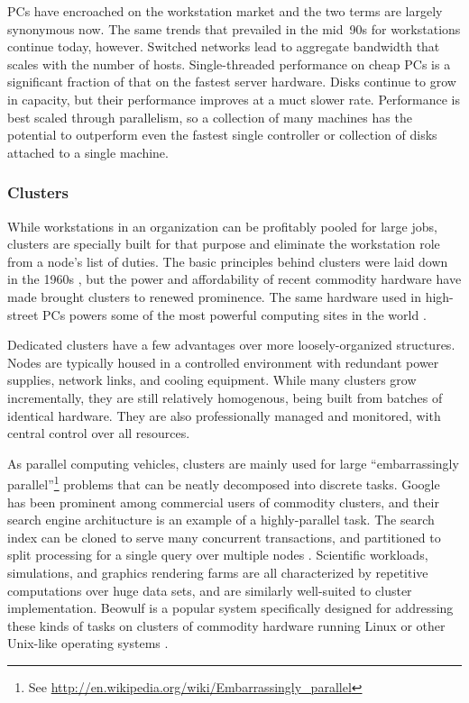 PCs have encroached on the workstation market and the two terms are largely synonymous now. The same trends that prevailed in the mid~90s for workstations continue today, however. Switched networks lead to aggregate bandwidth that scales with the number of hosts. Single-threaded performance on cheap PCs is a significant fraction of that on the fastest server hardware. Disks continue to grow in capacity, but their performance improves at a muct slower rate. Performance is best scaled through parallelism, so a collection of many machines has the potential to outperform even the fastest single controller or collection of disks attached to a single machine.

\subsubsection{Clusters}

While workstations in an organization can be profitably pooled for large jobs, clusters are specially built for that purpose and eliminate the workstation role from a node's list of duties. The basic principles behind clusters were laid down in the 1960s \cite{amdahl}, but the power and affordability of recent commodity hardware have made brought clusters to renewed prominence. The same hardware used in high-street PCs powers some of the most powerful computing sites in the world \cite{top500}.

Dedicated clusters have a few advantages over more loosely-organized structures. Nodes are typically housed in a controlled environment with redundant power supplies, network links, and cooling equipment. While many clusters grow incrementally, they are still relatively homogenous, being built from batches of identical hardware. They are also professionally managed and monitored, with central control over all resources.

As parallel computing vehicles, clusters are mainly used for large ``embarrassingly parallel''\footnote{See \url{http://en.wikipedia.org/wiki/Embarrassingly_parallel}} problems that can be neatly decomposed into discrete tasks. Google has been prominent among commercial users of commodity clusters, and their search engine architucture is an example of a highly-parallel task. The search index can be cloned to serve many concurrent transactions, and partitioned to split processing for a single query over multiple nodes \cite{barroso03}. Scientific workloads, simulations, and graphics rendering farms are all characterized by repetitive computations over huge data sets, and are similarly well-suited to cluster implementation. Beowulf is a popular system specifically designed for addressing these kinds of tasks on clusters of commodity hardware running Linux or other Unix-like operating systems \cite{ridge}.

